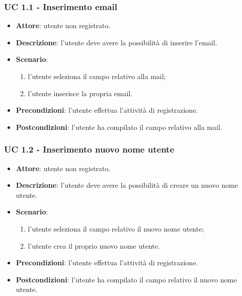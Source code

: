 \subsubsection{UC 1.1 - Inserimento email}
\begin{itemize}
    \item \textbf{Attore}: utente non registrato.
    \item \textbf{Descrizione}: l’utente deve avere la possibilità di inserire l’email.
    \item \textbf{Scenario}:
    \begin{enumerate}
        \item l’utente seleziona il campo relativo alla mail;
        \item l’utente inserisce la propria email.
    \end{enumerate}

    \item \textbf{Precondizioni}: l’utente effettua l’attività di registrazione.
    \item \textbf{Postcondizioni}: l’utente ha compilato il campo relativo alla mail.
\end{itemize}

\subsubsection{UC 1.2 - Inserimento nuovo nome utente}
\begin{itemize}
    \item \textbf{Attore}: utente non registrato.
    \item \textbf{Descrizione}: l’utente deve avere la possibilità di creare un nuovo nome utente.
    \item \textbf{Scenario}:
    \begin{enumerate}
        \item l’utente seleziona il campo relativo il nuovo nome utente;
        \item l’utente crea il proprio nuovo nome utente.
    \end{enumerate}

    \item \textbf{Precondizioni}: l’utente effettua l’attività di registrazione.
    \item \textbf{Postcondizioni}: l’utente ha compilato il campo relativo il nuovo nome utente.
\end{itemize}

